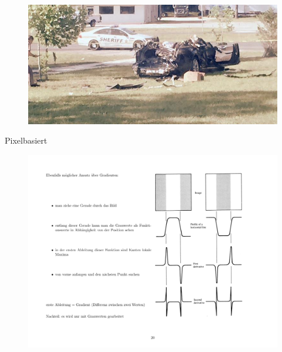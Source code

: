 \documentclass[hyperref={pdfpagelabels=false}]{beamer}
\begin{document}
\begin{frame}
	\begin{figure}[]
		\centering
		\includegraphics[width=\linewidth]{bilder/tesla.jpg}
		\label{fig:einstieg}
	\end{figure}
\end{frame}


\begin{frame}[t]{Pixelbasiert}
	\begin{figure}[]
		\centering
		\includegraphics[width=0.55\linewidth]{bilder/pixelbasiert.pdf}
		\label{fig:einstieg}
	\end{figure}
\end{frame}
\end{document}

